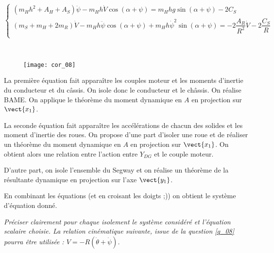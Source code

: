 $$
\left\{
\begin{array}{l}
\left( m_H h^2 +A_H + A_S\right)\ddot{\psi} - m_H h \dot{V} \cos\left(\alpha+\psi\right) = m_H hg \sin\left(\alpha + \psi\right) - 2C_S \\
\left( m_S +m_H + 2m_R\right)\dot{V} - m_H h \ddot{\psi} \cos\left(\alpha+\psi\right) 
+ m_H h \dot{\psi}^2 \sin\left(\alpha+\psi\right) =  - 2\dfrac{A_R}{R^2}\dot{V} - 2\dfrac{C_S}{R}  \\
\end{array}
\right.
$$
\ifprof
\begin{corrige} ~\\

\begin{figure}[H]
\centering
\texttt{[image: cor\_08]}
\end{figure}

La première équation fait apparaître les couples moteur et les moments d'inertie du conducteur et du câssis. On isole donc le conducteur et le châssis. On réalise BAME.
On applique le théorème du moment dynamique en $A$ en projection sur $\vect{x_1}$.

La seconde équation fait apparaître les accélérations de chacun des solides et les moment d'inertie des roues. 
On propose d'une part d'isoler une  roue et de réaliser un théorème du moment dynamique en $A$ en projection sur $\vect{x_1}$. On obtient alors une relation entre l'action entre $Y_{DG}$ et le couple moteur.

D'autre part, on isole l'ensemble du Segway et on réalise un théorème de la résultante dynamique en projection sur l'axe  $\vect{y_1}$.

En combinant les équations (et en croisant les doigts ;)) on obtient le système d'équation donné. 

\end{corrige}
\else
\fi

\textit{Préciser clairement pour chaque isolement le système considéré et l’équation scalaire choisie. La relation cinématique suivante, issue de la question \ref{q_08} pourra être utilisée :  $V=-R\left(\dot{\theta}+\dot{\psi}\right)$.}

